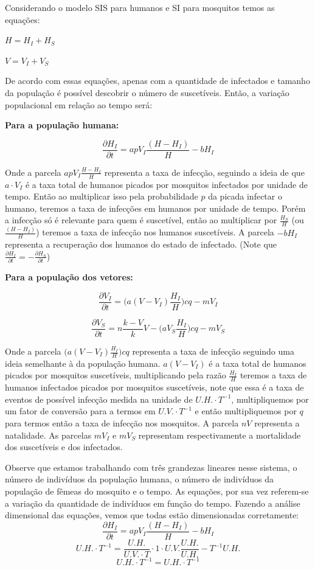 \documentclass[
	12pt,				%
	openright,			%
	twoside,			%
	a4paper,			%
	english,			%
	french,				%
	spanish,			%
	brazil				%
	]{abntex2}
\begin{document}
Considerando o modelo SIS para humanos e SI para mosquitos temos as equações:

$H = H_I+H_S$
 

$V = V_I + V_S$

De acordo com essas equações, apenas com a quantidade de infectados e tamanho da população é possível descobrir o número de suscetíveis. Então, a variação populacional em relação ao tempo será:

\textbf{Para a população humana:}

$$ \frac{\partial H_I}{\partial t}= a pV_I\frac{(H-H_I)}{H}- b H_I$$

Onde a parcela $a pV_I\frac{H-H_I}{H}$ representa a taxa de infecção, seguindo a ideia de que $a\cdot V_I$ é a taxa total de humanos picados por mosquitos infectados por unidade de tempo. Então ao multiplicar isso pela probabilidade $p$ da picada infectar o humano, teremos a taxa de infecções em humanos por unidade de tempo. Porém a infecção só é relevante para quem é suscetível, então ao multiplicar por $\frac{H_S}{H}$ (ou $\frac{(H-H_I)}{H}$) teremos a taxa de infecção nos humanos suscetíveis.
A parcela $-b H_I$ representa a recuperação dos humanos do estado de infectado. (Note que $\frac{\partial H_I}{\partial t}=-\frac{\partial H_S}{\partial t}$)

\textbf{Para a população dos vetores:}

$$ \frac{\partial V_I}{\partial t}= \Big(a(V-V_I)\frac{H_I}{H}\Big)cq-m V_I$$

$$ \frac{\partial V_S}{\partial t}= n\frac{k-V}{k}V-\Big(aV_S\frac{H_I}{H}\Big)cq-m V_S$$

Onde a parcela $\Big(a(V-V_I)\frac{H_I}{H}\Big)cq$ representa a taxa de infecção seguindo uma ideia semelhante à da população humana. $a(V-V_I)$ é a taxa total de humanos picados por mosquitos suscetíveis, multiplicando pela razão $\frac{H_I}{H}$ teremos a taxa de humanos infectados picados por mosquitos suscetíveis, note que essa é a taxa de eventos de possível infecção medida na unidade de $U.H.\cdot T^{-1}$, multipliquemos por um fator de conversão para a termos em $U.V.\cdot T^{-1}$ e então multipliquemos por $q$ para termos então a taxa de infecção nos mosquitos. A parcela $nV$ representa a natalidade. As parcelas $mV_I$ e $mV_S$ representam respectivamente a mortalidade dos suscetíveis e dos infectados.

Observe que estamos trabalhando com três grandezas lineares nesse sistema, o número de indivíduos da população humana, o número de indivíduos da população de fêmeas do mosquito e o tempo. As equações, por sua vez referem-se a variação da quantidade de indivíduos em função do tempo. Fazendo a análise dimensional das equações, vemos que todas estão dimensionadas corretamente:
$$ \frac{\partial H_I}{\partial t}= a pV_I\frac{(H-H_I)}{H}- b H_I$$
$$U.H.\cdot T^{-1}=\frac{U.H.}{U.V.\cdot T}\cdot 1\cdot U.V.\frac{U.H.}{U.H.} - T^{-1}U.H.$$
$$U.H.\cdot T^{-1}=U.H.\cdot T^{-1}$$
\end{document}
